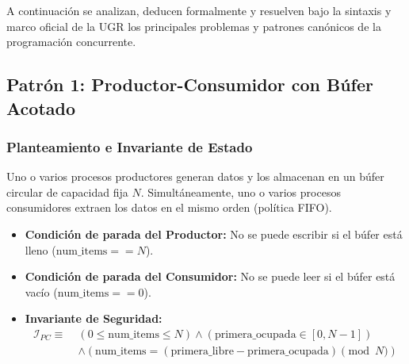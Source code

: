 A continuación se analizan, deducen formalmente y resuelven bajo la sintaxis y marco oficial de la UGR los principales problemas y patrones canónicos de la programación concurrente.

\subsection{Patrón 1: Productor-Consumidor con Búfer Acotado}

\subsubsection{Planteamiento e Invariante de Estado}
Uno o varios procesos productores generan datos y los almacenan en un búfer circular de capacidad fija $N$. Simultáneamente, uno o varios procesos consumidores extraen los datos en el mismo orden (política FIFO).

\begin{itemize}[leftmargin=*]
    \item \textbf{Condición de parada del Productor:} No se puede escribir si el búfer está lleno ($\text{num\_items} == N$).
    \item \textbf{Condición de parada del Consumidor:} No se puede leer si el búfer está vacío ($\text{num\_items} == 0$).
    \item \textbf{Invariante de Seguridad:}
    \[
    \begin{aligned}
    \mathcal{I}_{PC} \equiv \; & (0 \le \text{num\_items} \le N) \land (\text{primera\_ocupada} \in [0, N-1]) \\
    & \land (\text{num\_items} = (\text{primera\_libre} - \text{primera\_ocupada}) \pmod N)
    \end{aligned}
    \]
\end{itemize}

